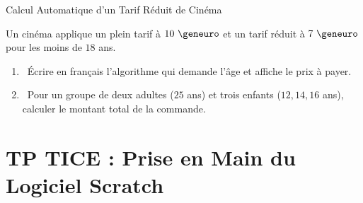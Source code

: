 \begin{exercice}[4 pts][\capRealiser]{Calcul Automatique d'un Tarif Réduit de Cinéma}
\noindent
\begin{minipage}[c]{0.58\linewidth}
Un cinéma applique un plein tarif à $10\text{ \euro}$ et un tarif réduit à $7\text{ \euro}$ pour les moins de $18$ ans.
\begin{enumerate}[leftmargin=1.2em, itemsep=1pt]
    \item \capRealiser\ Écrire en français l'algorithme qui demande l'âge et affiche le prix à payer.
    \item \capValider\ Pour un groupe de deux adultes ($25$ ans) et trois enfants ($12, 14, 16$ ans), calculer le montant total de la commande.
\end{enumerate}
\end{minipage}\hfill
\begin{minipage}[c]{0.38\linewidth}
\centering
{}
\end{minipage}

\vspace{1mm}
\lignesreponse[2]
\end{exercice}

\section{TP TICE : Prise en Main du Logiciel Scratch}

